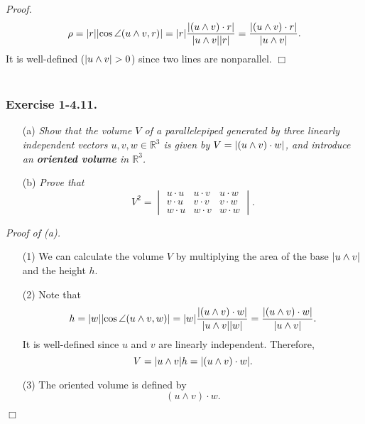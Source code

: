 \documentclass{article}
\begin{document}
\emph{Proof.}
\[
  \rho
  = |r| \abs{\cos\angle(u \wedge v, r)}
  = |r| \frac{\abs{(u \wedge v) \cdot r}}{\abs{u \wedge v}|r|}
  = \frac{\abs{(u \wedge v) \cdot r}}{\abs{u \wedge v}}.
\]
It is well-defined ($\abs{u \wedge v} > 0$) since two lines are nonparallel.
$\Box$ \\\\






\subsubsection*{Exercise 1-4.11.}
\begin{enumerate}
\item[(a)]
  \emph{Show that the volume $V$ of a parallelepiped generated by three linearly independent vectors
  $u, v, w \in \mathbb{R}^3$ is given by $V = \abs{(u \wedge v) \cdot w}$,
  and introduce an \textbf{oriented volume} in $\mathbb{R}^3$.}

\item[(b)]
  \emph{Prove that}
  \[
    V^2
    = \begin{vmatrix}
      u \cdot u & u \cdot v & u \cdot w \\
      v \cdot u & v \cdot v & v \cdot w \\
      w \cdot u & w \cdot v & w \cdot w
    \end{vmatrix}.
  \]
\end{enumerate}



\emph{Proof of (a).}
\begin{enumerate}
\item[(1)]
  We can calculate the volume $V$ by
  multiplying the area of the base $\abs{u \wedge v}$ and the height $h$.

\item[(2)]
  Note that
  \[
    h
    = |w| \abs{\cos\angle(u \wedge v, w)}
    = |w| \frac{\abs{(u \wedge v) \cdot w}}{\abs{u \wedge v}|w|}
    = \frac{\abs{(u \wedge v) \cdot w}}{\abs{u \wedge v}}.
  \]
  It is well-defined since $u$ and $v$ are linearly independent.
  Therefore,
  \[
    V = \abs{u \wedge v} h = \abs{(u \wedge v) \cdot w}.
  \]

\item[(3)]
  The oriented volume is defined by
  \[
    (u \wedge v) \cdot w.
  \]
\end{enumerate}
$\Box$ \\
\end{document}
